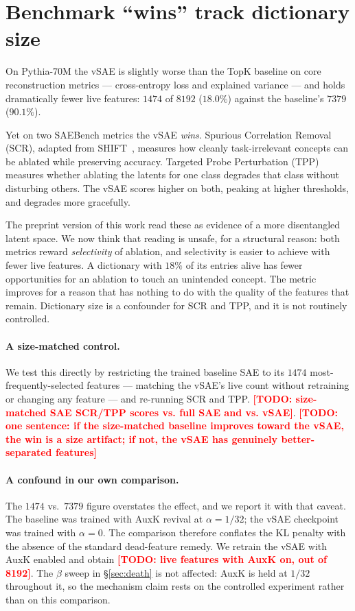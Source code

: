 \documentclass{article}
\newcommand{\TODO}[1]{\textcolor{red}{\textbf{[TODO: #1]}}}
\begin{document}
\section{Benchmark ``wins'' track dictionary size}
\label{sec:artifact}

On Pythia-70M the vSAE is slightly worse than the TopK baseline on core
reconstruction metrics --- cross-entropy loss and explained variance --- and holds
dramatically fewer live features: $1474$ of $8192$ ($18.0\%$) against the
baseline's $7379$ ($90.1\%$).

Yet on two SAEBench metrics the vSAE \emph{wins}. Spurious Correlation Removal
(SCR), adapted from SHIFT~\citep{marks2025sparsefeaturecircuitsdiscovering},
measures how cleanly task-irrelevant concepts can be ablated while preserving
accuracy. Targeted Probe Perturbation (TPP) measures whether ablating the latents
for one class degrades that class without disturbing others. The vSAE scores
higher on both, peaking at higher thresholds, and degrades more gracefully.

The preprint version of this work read these as evidence of a more disentangled
latent space. We now think that reading is unsafe, for a structural reason: both
metrics reward \emph{selectivity} of ablation, and selectivity is easier to
achieve with fewer live features. A dictionary with $18\%$ of its entries alive
has fewer opportunities for an ablation to touch an unintended concept. The metric
improves for a reason that has nothing to do with the quality of the features that
remain. Dictionary size is a confounder for SCR and TPP, and it is not routinely
controlled.

\paragraph{A size-matched control.} We test this directly by restricting the
trained baseline SAE to its $1474$ most-frequently-selected features --- matching
the vSAE's live count without retraining or changing any feature --- and re-running
SCR and TPP. \TODO{size-matched SAE SCR/TPP scores vs. full SAE and vs. vSAE}.
\TODO{one sentence: if the size-matched baseline improves toward the vSAE, the
win is a size artifact; if not, the vSAE has genuinely better-separated features}

\paragraph{A confound in our own comparison.} The $1474$ vs.\ $7379$ figure
overstates the effect, and we report it with that caveat. The baseline was trained
with AuxK revival at $\alpha=1/32$; the vSAE checkpoint was trained with
$\alpha=0$. The comparison therefore conflates the KL penalty with the absence of
the standard dead-feature remedy. We retrain the vSAE with AuxK enabled and obtain
\TODO{live features with AuxK on, out of 8192}. The $\beta$ sweep in
\S\ref{sec:death} is not affected: AuxK is held at $1/32$ throughout it, so the
mechanism claim rests on the controlled experiment rather than on this comparison.
\end{document}
